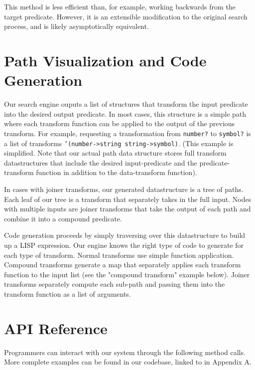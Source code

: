 \documentclass[letterpaper]{article}
\begin{document}
This method is less efficient than, for example, working backwards from the target predicate.  However, it is an extensible modification to the original search process, and is likely asymptotically equivalent.

\section{Path Visualization and Code Generation}
Our search engine ouputs a list of structures that transform the input predicate into the desired output predicate. In most cases, this structure is a simple path where each transform function can be applied to the output of the previous transform. For example, requesting a transformation from \texttt{number?} to \texttt{symbol?} is a list of transforms \texttt{'(number->string string->symbol)}. (This example is simplified. Note that our actual path data structure stores full transform datastructures that include the desired input-predicate and the predicate-transform function in addition to the data-transform function).

In cases with joiner transforms, our generated datastructure is a tree of paths. Each leaf of our tree is a transform that separately takes in the full input. Nodes with multiple inputs are joiner transforms that take the output of each path and combine it into a compound predicate.

Code generation proceeds by simply traversing over this datastructure to build up a LISP expression. Our engine knows the right type of code to generate for each type of transform. Normal transforms use simple function application. Compound transforms generate a map that separately applies each transform function to the input list (see the "compound transform" example below). Joiner transforms separately compute each sub-path and passing them into the transform function as a list of arguments.

\section{API Reference}

Programmers can interact with our system through the following method calls.  More complete examples can be found in our codebase, linked to in Appendix A.

\newcommand{\doc}[3]{\item \texttt{#1}: #2\\\\Example: \texttt{#3}}
\end{document}
